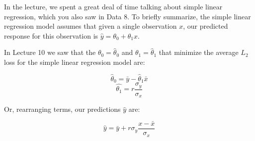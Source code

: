 \documentclass[addpoints, 12pt]{exam}
\theoremstyle{definition}
\newtheorem*{answer}{Answer}
\begin{document}
\begin{questions}


\vspace{-1em}

\question[10] In the lecture, we spent a great deal of time talking about  simple linear regression, which you also saw in Data 8. To briefly summarize, the simple linear regression model assumes that given a single observation $x$, our predicted response for this observation is $\hat{y} = \theta_0 + \theta_1x$. 

In Lecture 10 we saw that the $\theta_0 = \hat{\theta}_0$ and $\theta_1 = \hat{\theta}_1$ that minimize the average $L_2$ loss for the simple linear regression model are:

$$\hat{\theta}_0 = \bar{y} - \hat{\theta}_1\bar{x} $$
$$\hat{\theta_1} = r\frac{\sigma_y}{\sigma_x}$$

Or, rearranging terms, our predictions $\hat{y}$ are:

$$\hat{y} = \bar{y} + r \sigma_y \frac{x - \bar{x}}{\sigma_x}$$

\end{questions}
\end{document}
